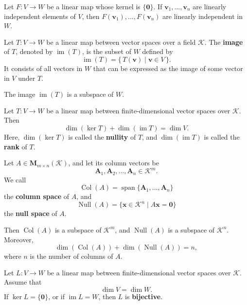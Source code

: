 \documentclass{ctexart}
\begin{document}
	\begin{mythm}
		Let $F : V \to W$ be a linear map whose kernel is $\{\mathbf{0}\}$.
		If $\mathbf{v}_1, \dots, \mathbf{v}_n$ are linearly independent elements of $V$,  
		then $F(\mathbf{v}_1), \dots, F(\mathbf{v}_n)$ are linearly independent in $W$.
	\end{mythm}
	
	\begin{mydef}
		Let $T : V \to W$ be a linear map between vector spaces over a field $\mathcal{K}$.  
		The \textbf{image} of $T$, denoted by $\operatorname{im}(T)$, is the subset of $W$ defined by
		\[
		\operatorname{im}(T) = \{\, T(\mathbf{v}) \mid \mathbf{v} \in V \,\}.
		\]
		It consists of all vectors in $W$ that can be expressed as the image of some vector in $V$ under $T$.  
		
	\end{mydef}
	
	\begin{myrmk}
		The image $\operatorname{im}(T)$ is a subspace of $W$.
	\end{myrmk}
	
	\begin{mythm}
		Let $T : V \to W$ be a linear map between finite-dimensional vector spaces over $\mathcal{K}$.  
		Then
		\[
		\dim(\ker T) + \dim(\operatorname{im} T) = \dim V.
		\]
		Here, $\dim(\ker T)$ is called the \textbf{nullity} of $T$,  
		and $\dim(\operatorname{im} T)$ is called the \textbf{rank} of $T$.
	\end{mythm}
	
	\begin{mythm}
		Let $A \in \mathbf{M}_{m \times n}(\mathcal{K})$, and let its column vectors be
		\[
		\mathbf{A}_1, \mathbf{A}_2, \dots, \mathbf{A}_n \in \mathcal{K}^m.
		\]
		We call
		\[
		\operatorname{Col}(A) = \operatorname{span}\{\mathbf{A}_1, \dots, \mathbf{A}_n\}
		\]
		the \textbf{column space} of $A$, and
		\[
		\operatorname{Null}(A) = \{\mathbf{x} \in \mathcal{K}^n \mid A\mathbf{x} = \mathbf{0}\}
		\]
		the \textbf{null space} of $A$.
		
		Then $\operatorname{Col}(A)$ is a subspace of $\mathcal{K}^m$,  
		and $\operatorname{Null}(A)$ is a subspace of $\mathcal{K}^n$.  
		Moreover,
		\[
		\dim(\operatorname{Col}(A)) + \dim(\operatorname{Null}(A)) = n,
		\]
		where $n$ is the number of columns of $A$.  
	\end{mythm}
	
	
	\begin{mythm}
		Let $L : V \to W$ be a linear map between finite-dimensional vector spaces over $\mathcal{K}$.  
		Assume that
		\[
		\dim V = \dim W.
		\]
		If $\ker L = \{\mathbf{0}\}$, or if $\operatorname{im} L = W$,  
		then $L$ is \textbf{bijective}.
	\end{mythm}
	
\end{document}
